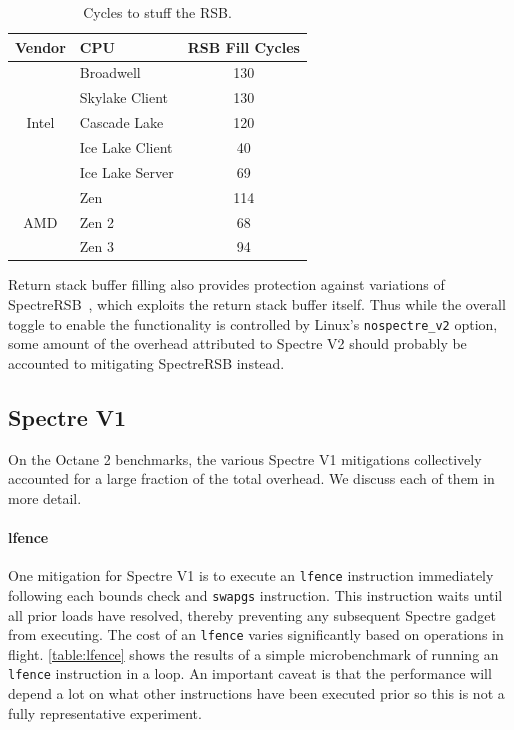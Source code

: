 \begin{table}[h]
  \begin{center}
  \begin{tabular}{clc}
      \textbf{Vendor} & \textbf{CPU} & \textbf{RSB Fill Cycles} \\ \hline
      \multirow{5}{*}{Intel} & Broadwell       & 130 \\
                             & Skylake Client  & 130 \\
                             & Cascade Lake    & 120 \\
                             & Ice Lake Client & 40 \\
                             & Ice Lake Server & 69 \\ \hline
      \multirow{3}{*}{AMD}   & Zen             & 114 \\
                             & Zen 2           & 68 \\
                             & Zen 3           & 94 \\ \hline
  \end{tabular}
  \end{center}
  \caption{Cycles to stuff the RSB. }
  \label{table:rsb-fill}
\end{table}

Return stack buffer filling also provides protection against variations of
SpectreRSB~\cite{koruyeh:spectrersb}, which exploits the return stack buffer itself.
Thus while the overall toggle to enable the functionality is controlled by Linux's \texttt{nospectre\_v2} option, some amount of the overhead attributed to Spectre V2 should probably be accounted to mitigating SpectreRSB instead.

\subsection{Spectre V1}

On the Octane 2 benchmarks, the various Spectre V1 mitigations collectively accounted for a large fraction of the total overhead.
We discuss each of them in more detail.

\paragraph{lfence}

One mitigation for Spectre V1 is to execute an \texttt{lfence} instruction immediately following each bounds check and \texttt{swapgs} instruction.
This instruction waits until all prior loads have resolved, thereby preventing any subsequent Spectre gadget from executing.
The cost of an \texttt{lfence} varies significantly based on operations in flight.
\autoref{table:lfence} shows the results of a simple microbenchmark of running an \texttt{lfence} instruction in a loop.
An important caveat is that the performance will depend a lot on what other instructions have been executed prior so this is not a fully representative experiment.

